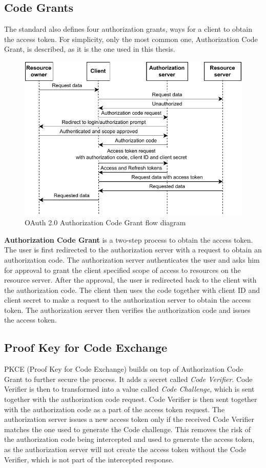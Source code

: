 \subsection*{Code Grants}
The standard also defines four authorization grants, ways for a client to obtain the access token. For simplicity, only the most common one, Authorization Code Grant, is described, as it is the one used in this thesis.

\begin{figure}[hbt]
  \centering
  \includegraphics[width=.8 \linewidth]{figures/auth-sequence-auth-code.pdf}
  \caption{OAuth 2.0 Authorization Code Grant flow diagram}
  \label{fig:oauth2_auth_code_grant}
\end{figure}

\textbf{Authorization Code Grant} is a two-step process to obtain the access token. The user is first redirected to the authorization server with a request to obtain an authorization code. The authorization server authenticates the user and asks him for approval to grant the client specified scope of access to resources on the resource server. After the approval, the user is redirected back to the client with the authorization code. The client then uses the code together with client ID and client secret to make a request to the authorization server to obtain the access token. The authorization server then verifies the authorization code and issues the access token.

\subsection*{Proof Key for Code Exchange}
PKCE (Proof Key for Code Exchange) \cite{pkce_rfc} builds on top of Authorization Code Grant to further secure the process. It adds a secret called \emph{Code Verifier}. Code Verifier is then to transformed into a value called \emph{Code Challenge}, which is sent together with the authorization code request. Code Verifier is then sent together with the authorization code as a part of the access token request. The authorization server issues a new access token only if the received Code Verifier matches the one used to generate the Code challenge. This removes the risk of the authorization code being intercepted and used to generate the access token, as the authorization server will not create the access token without the Code Verifier, which is not part of the intercepted response.

